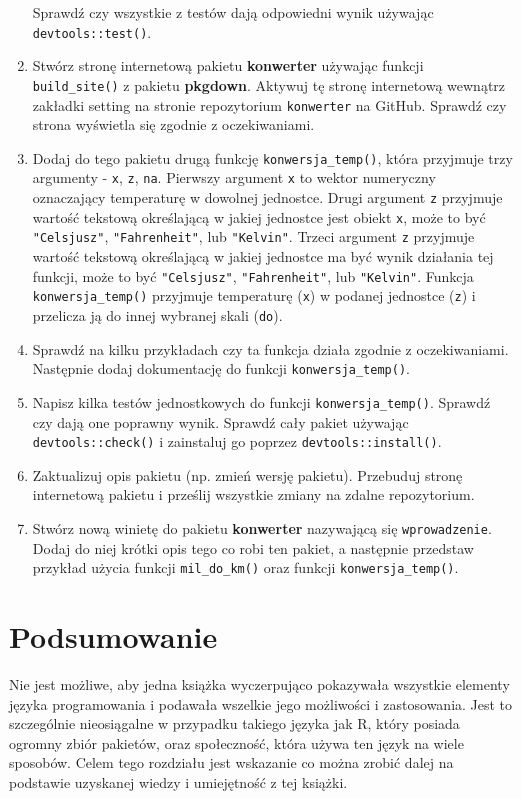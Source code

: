 \documentclass[paper=6in:9in,pagesize=pdftex,headinclude=on,footinclude=on,10pt]{scrbook}
\begin{document}
\begin{enumerate}
  Sprawdź czy wszystkie z testów dają odpowiedni wynik używając \texttt{devtools::test()}.
\item
  Stwórz stronę internetową pakietu \textbf{konwerter} używając funkcji \texttt{build\_site()} z pakietu \textbf{pkgdown}.
  Aktywuj tę stronę internetową wewnątrz zakładki setting na stronie repozytorium \texttt{konwerter} na GitHub.
  Sprawdź czy strona wyświetla się zgodnie z oczekiwaniami.
\item
  Dodaj do tego pakietu drugą funkcję \texttt{konwersja\_temp()}, która przyjmuje trzy argumenty - \texttt{x}, \texttt{z}, \texttt{na}.
  Pierwszy argument \texttt{x} to wektor numeryczny oznaczający temperaturę w dowolnej jednostce.
  Drugi argument \texttt{z} przyjmuje wartość tekstową określającą w jakiej jednostce jest obiekt \texttt{x}, może to być \texttt{"Celsjusz"}, \texttt{"Fahrenheit"}, lub \texttt{"Kelvin"}.
  Trzeci argument \texttt{z} przyjmuje wartość tekstową określającą w jakiej jednostce ma być wynik działania tej funkcji, może to być \texttt{"Celsjusz"}, \texttt{"Fahrenheit"}, lub \texttt{"Kelvin"}.
  Funkcja \texttt{konwersja\_temp()} przyjmuje temperaturę (\texttt{x}) w podanej jednostce (\texttt{z}) i przelicza ją do innej wybranej skali (\texttt{do}).
\item
  Sprawdź na kilku przykładach czy ta funkcja działa zgodnie z oczekiwaniami.
  Następnie dodaj dokumentację do funkcji \texttt{konwersja\_temp()}.
\item
  Napisz kilka testów jednostkowych do funkcji \texttt{konwersja\_temp()}.
  Sprawdź czy dają one poprawny wynik.
  Sprawdź cały pakiet używając \texttt{devtools::check()} i zainstaluj go poprzez \texttt{devtools::install()}.
\item
  Zaktualizuj opis pakietu (np. zmień wersję pakietu).
  Przebuduj stronę internetową pakietu i prześlij wszystkie zmiany na zdalne repozytorium.
\item
  Stwórz nową winietę do pakietu \textbf{konwerter} nazywającą się \texttt{wprowadzenie}.
  Dodaj do niej krótki opis tego co robi ten pakiet, a następnie przedstaw przykład użycia funkcji \texttt{mil\_do\_km()} oraz funkcji \texttt{konwersja\_temp()}.
\end{enumerate}

\hypertarget{podsumowanie}{%
\chapter{Podsumowanie}\label{podsumowanie}}

Nie jest możliwe, aby jedna książka wyczerpująco pokazywała wszystkie elementy języka programowania i podawała wszelkie jego możliwości i zastosowania.
Jest to szczególnie nieosiągalne w przypadku takiego języka jak R, który posiada ogromny zbiór pakietów, oraz społeczność, która używa ten język na wiele sposobów.
Celem tego rozdziału jest wskazanie co można zrobić dalej na podstawie uzyskanej wiedzy i umiejętność z tej książki.
\end{document}

